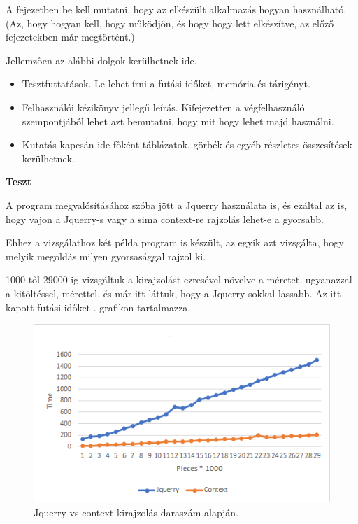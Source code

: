 
A fejezetben be kell mutatni, hogy az elkészült alkalmazás hogyan használható.
(Az, hogy hogyan kell, hogy működjön, és hogy hogy lett elkészítve, az előző fejezetekben már megtörtént.)

Jellemzően az alábbi dolgok kerülhetnek ide.
\begin{itemize}
\item Tesztfuttatások. Le lehet írni a futási időket, memória és tárigényt.
\item Felhasználói kézikönyv jellegű leírás. Kifejezetten a végfelhasználó szempontjából lehet azt bemutatni, hogy mit hogy lehet majd használni.
\item Kutatás kapcsán ide főként táblázatok, görbék és egyéb részletes összesítések kerülhetnek.

\end{itemize}

\textbf{Teszt}


A program megvalósításához szóba jött a Jquerry használata is, és ezáltal az is, hogy vajon a Jquerry-s vagy a sima context-re rajzolás lehet-e a gyorsabb.

Ehhez a vizsgálathoz két példa program is készült, az egyik azt vizsgálta, hogy melyik megoldás milyen gyorsasággal rajzol ki. 

1000-től 29000-ig vizsgáltuk a kirajzolást ezresével növelve a méretet, ugyanazzal a kitöltéssel, mérettel, és már itt láttuk, hogy a Jquerry sokkal lassabb. Az itt kapott futási időket . grafikon tartalmazza. 

\begin{figure}[h]
	\centering
	\includegraphics[scale=1]{images/pieces.png}
	\caption{Jquerry vs context kirajzolás daraszám alapján.}
	\label{fig:pieces}
\end{figure}


